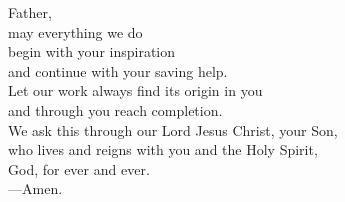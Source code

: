 \prayer


\begin{prayerverse}
Father,\\
may everything we do\\
begin with your inspiration\\
and continue with your saving help.\\
Let our work always find its origin in you\\
and through you reach completion.\\
We ask this through our Lord Jesus Christ, your Son,\\
who lives and reigns with you and the Holy Spirit,\\
God, for ever and ever.\\
{\color{red}---\thinspace}Amen.
\end{prayerverse}

